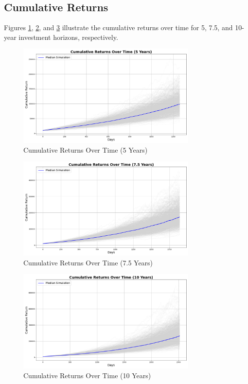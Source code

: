 \subsection{Cumulative Returns}
Figures \ref{fig:cumulative_returns_5y}, \ref{fig:cumulative_returns_7_5y}, and \ref{fig:cumulative_returns_10y} illustrate the cumulative returns over time for 5, 7.5, and 10-year investment horizons, respectively.

\begin{figure}[!htbp]
    \centering
    \includegraphics[width=0.8\textwidth]{../Figures/cumulative_returns_over_time_5_years.png}
    \caption{Cumulative Returns Over Time (5 Years)}
    \label{fig:cumulative_returns_5y}
\end{figure}

\begin{figure}[!htbp]
    \centering
    \includegraphics[width=0.8\textwidth]{../Figures/cumulative_returns_over_time_7_5_years.png}
    \caption{Cumulative Returns Over Time (7.5 Years)}
    \label{fig:cumulative_returns_7_5y}
\end{figure}

\begin{figure}[!htbp]
    \centering
    \includegraphics[width=0.8\textwidth]{../Figures/cumulative_returns_over_time_10_years.png}
    \caption{Cumulative Returns Over Time (10 Years)}
    \label{fig:cumulative_returns_10y}
\end{figure}

